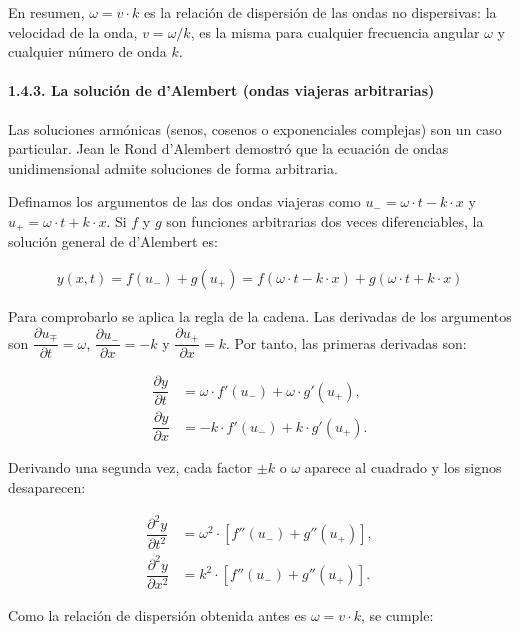 \documentclass[
  spanish,
]{article}
\begin{document}
En resumen, \(\omega = v \cdot k\) es la relación de dispersión de las
ondas no dispersivas: la velocidad de la onda, \(v = \omega/k\), es la
misma para cualquier frecuencia angular \(\omega\) y cualquier número de
onda \(k\).

\paragraph{1.4.3. La solución de d'Alembert (ondas viajeras
arbitrarias)}\label{la-soluciuxf3n-de-dalembert-ondas-viajeras-arbitrarias}

Las soluciones armónicas (senos, cosenos o exponenciales complejas) son
un caso particular. Jean le Rond d'Alembert demostró que la ecuación de
ondas unidimensional admite soluciones de forma arbitraria.

Definamos los argumentos de las dos ondas viajeras como
\(u_- = \omega \cdot t - k \cdot x\) y
\(u_+ = \omega \cdot t + k \cdot x\). Si \(f\) y \(g\) son funciones
arbitrarias dos veces diferenciables, la solución general de d'Alembert
es:

\[
\begin{aligned}
y(x,t) = f(u_-) + g(u_+) = f(\omega \cdot t - k \cdot x) + g(\omega \cdot t + k \cdot x)
\end{aligned}
\]

Para comprobarlo se aplica la regla de la cadena. Las derivadas de los
argumentos son \(\dfrac{\partial u_\mp}{\partial t} = \omega\),
\(\dfrac{\partial u_-}{\partial x} = -k\) y
\(\dfrac{\partial u_+}{\partial x} = k\). Por tanto, las primeras
derivadas son:

\[
\begin{aligned}
\dfrac{\partial y}{\partial t} &= \omega \cdot f'(u_-) + \omega \cdot g'(u_+), \\
\dfrac{\partial y}{\partial x} &= -k \cdot f'(u_-) + k \cdot g'(u_+).
\end{aligned}
\]

Derivando una segunda vez, cada factor \(\pm k\) o \(\omega\) aparece al
cuadrado y los signos desaparecen:

\[
\begin{aligned}
\dfrac{\partial^2 y}{\partial t^2} &= \omega^2 \cdot \left[f''(u_-) + g''(u_+)\right], \\
\dfrac{\partial^2 y}{\partial x^2} &= k^2 \cdot \left[f''(u_-) + g''(u_+)\right].
\end{aligned}
\]

Como la relación de dispersión obtenida antes es \(\omega = v \cdot k\),
se cumple:
\end{document}
